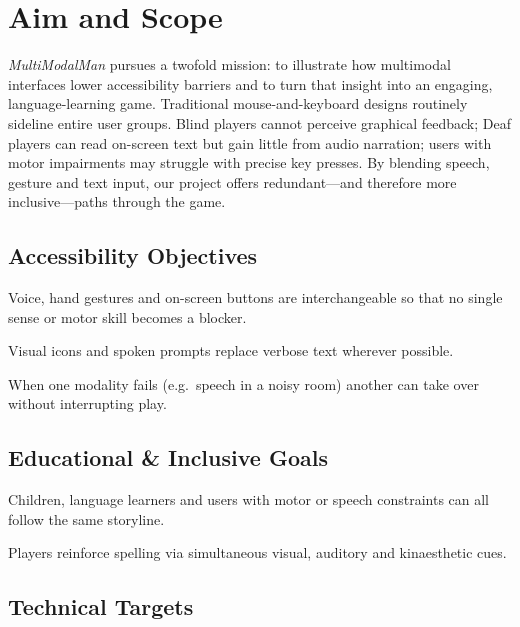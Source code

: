 \section{Aim and Scope}

\noindent
\textit{MultiModalMan} pursues a twofold mission: to illustrate how multimodal interfaces lower accessibility barriers and to turn that insight into an engaging, language-learning game.  Traditional mouse-and-keyboard designs routinely sideline entire user groups.  Blind players cannot perceive graphical feedback; Deaf players can read on-screen text but gain little from audio narration; users with motor impairments may struggle with precise key presses.  By blending speech, gesture and text input, our project offers redundant—and therefore more inclusive—paths through the game.

\subsection{Accessibility Objectives}

\begin{description}[leftmargin=1.2em,style=nextline]
  \item[\textbf{Multiple channels}] Voice, hand gestures and on-screen buttons are interchangeable so that no single sense or motor skill becomes a blocker.
  \item[\textbf{Low reading load}] Visual icons and spoken prompts replace verbose text wherever possible.
  \item[\textbf{Complementarity}] When one modality fails (e.g.\ speech in a noisy room) another can take over without interrupting play.
\end{description}

\subsection{Educational \& Inclusive Goals}

\begin{description}[leftmargin=1.2em,style=nextline]
  \item[\textbf{Broad reach}] Children, language learners and users with motor or speech constraints can all follow the same storyline.
  \item[\textbf{Multisensory learning}] Players reinforce spelling via simultaneous visual, auditory and kinaesthetic cues.
\end{description}

\subsection{Technical Targets}

